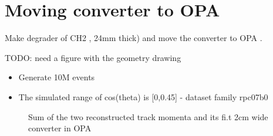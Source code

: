 %
\section{Moving converter to OPA}

Make degrader of CH2 , 24mm thick) and move the converter to OPA .

{\red TODO: need a figure with the geometry drawing}

\begin{itemize}
\item
  Generate 10M events
\item 
  The simulated range of cos(theta) is [0,0.45] - dataset family rpc07b0
\end{itemize}

\begin{figure}[H]
  \caption{
    \label{figure:t2_1_smom_0}
    Sum of the two reconstructed track momenta and its fi.t 2cm wide converter in OPA
  }
  \label{figure:event_display}
\end{figure}


